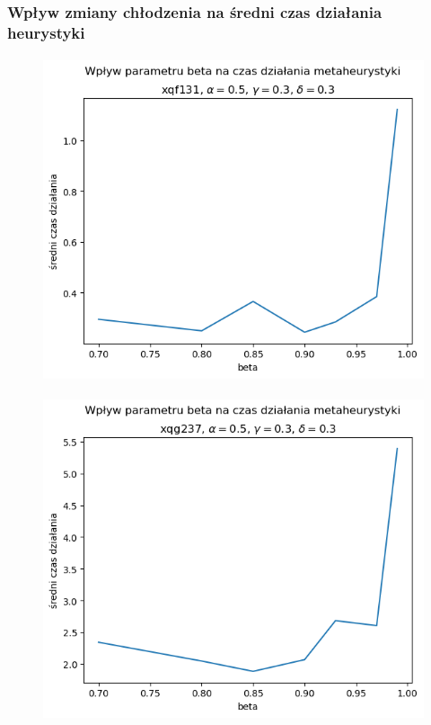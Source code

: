 \documentclass{article}
\begin{document}
\subsubsection{Wpływ zmiany chłodzenia na średni czas działania heurystyki}
    \begin{figure}[h!]
        \centering
        \includegraphics[height=9.5cm]{../../plots/sa-tuning-beta-time-xqf131.png}
    \end{figure}
    
    \begin{figure}[h!]
        \centering
        \includegraphics[height=9.5cm]{../../plots/sa-tuning-beta-time-xqg237.png}
    \end{figure}

\newpage
\end{document}
